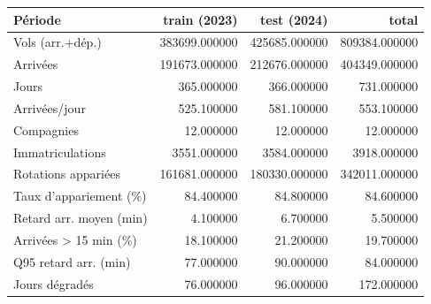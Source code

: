 \begin{tabular}{lrrr}
\toprule
Période & train (2023) & test (2024) & total \\
\midrule
Vols (arr.+dép.) & 383699.000000 & 425685.000000 & 809384.000000 \\
Arrivées & 191673.000000 & 212676.000000 & 404349.000000 \\
Jours & 365.000000 & 366.000000 & 731.000000 \\
Arrivées/jour & 525.100000 & 581.100000 & 553.100000 \\
Compagnies & 12.000000 & 12.000000 & 12.000000 \\
Immatriculations & 3551.000000 & 3584.000000 & 3918.000000 \\
Rotations appariées & 161681.000000 & 180330.000000 & 342011.000000 \\
Taux d'appariement (\%) & 84.400000 & 84.800000 & 84.600000 \\
Retard arr. moyen (min) & 4.100000 & 6.700000 & 5.500000 \\
Arrivées > 15 min (\%) & 18.100000 & 21.200000 & 19.700000 \\
Q95 retard arr. (min) & 77.000000 & 90.000000 & 84.000000 \\
Jours dégradés & 76.000000 & 96.000000 & 172.000000 \\
\bottomrule
\end{tabular}
